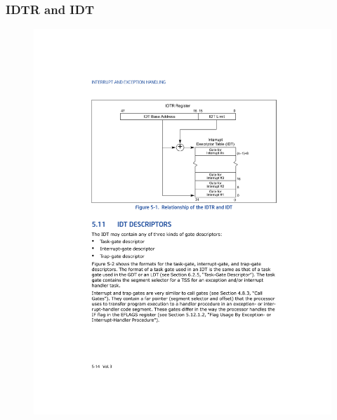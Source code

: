 \documentclass[aspectratio=169]{beamer}
\begin{document}
\begin{frame}
    \frametitle{IDTR and IDT}
    \begin{figure}
    \centering
        \includegraphics[scale=0.8]{img/idtr_and_idt}
    \end{figure}
\end{frame}
\end{document}
